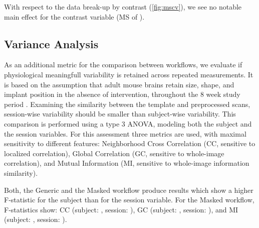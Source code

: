 With respect to the data break-up by contrast (\cref{fig:mscv}), we see no notable main effect for the contrast variable
(MS of ).
%

\subsection{Variance Analysis}
As an additional metric for the comparison between workflows, we evaluate if physiological meaningfull variability is retained across repeated measurements.
It is based on the assumption that adult mouse brains retain size, shape, and implant position in the absence of intervention, throughout the 8 week study period \cite{ioanas_optimized_2019}.
Examining the similarity between the template and preprocessed scans, session-wise variability should be smaller than subject-wise variability.
This comparison is performed using a type 3 ANOVA, modeling both the subject and the session variables.
For this assessment three metrics are used, with maximal sensitivity to different features:
Neighborhood Cross Correlation (CC, sensitive to localized correlation),
Global Correlation (GC, sensitive to whole-image correlation),
and Mutual Information (MI, sensitive to whole-image information similarity).

Both, the Generic and the Masked workflow produce results which show a higher F-statistic for the subject than for the session variable.
For the Masked workflow, F-statistics show:
CC (subject: , session: ),
GC (subject: , session: ),
and MI (subject: , session: ).

